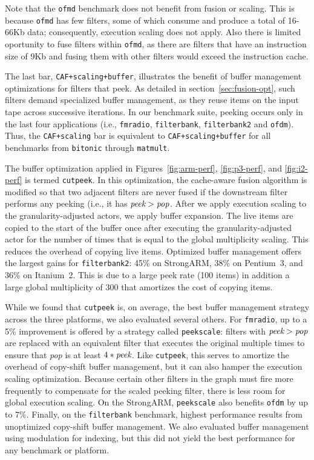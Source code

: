 Note that the \texttt{ofmd} benchmark does not benefit from fusion or
scaling. This is because \texttt{ofmd} has few filters, some of which
consume and produce a total of 16-66Kb data; consequently, execution
scaling does not apply.  Also there is limited oportunity to fuse
filters within \texttt{ofmd}, as there are filters that have an
instruction size of 9Kb and fusing them with other filters would
exceed the instruction cache.

The last bar, {\tt CAF+scaling+buffer}, illustrates the benefit of
buffer management optimizations for filters that peek.  As detailed in
section~\ref{sec:fusion-opt}, such filters demand specialized buffer
management, as they reuse items on the input tape across successive
iterations.  In our benchmark suite, peeking occurs only in the last
four applications (i.e., \texttt{fmradio}, \texttt{filterbank},
\texttt{filterbank2} and \texttt{ofdm}).  Thus, the {\tt CAF+scaling}
bar is equivalent to {\tt CAF+scaling+buffer} for all benchmarks from
{\tt bitonic} through {\tt matmult}.

The buffer optimization applied in Figures~\ref{fig:arm-perf},
\ref{fig:p3-perf}, and \ref{fig:i2-perf} is termed {\tt cutpeek}.  In
this optimization, the cache-aware fusion algorithm is modified so
that two adjacent filters are never fused if the downstream filter
performs any peeking (i.e., it has $\mbox{\it peek} > \mbox{\it pop}$.
After we apply execution scaling to the granularity-adjusted actors,
we apply buffer expansion.  The live items are copied to the start of
the buffer once after executing the granularity-adjusted actor for the
number of times that is equal to the global multiplicity scaling. This
reduces the overhead of copying live items.  Optimized buffer
management offers the largest gains for {\tt filterbank2}: 45\%
on StrongARM, 38\% on Pentium~3, and 36\% on Itanium~2.
This is due to a large peek rate (100 items) in addition a large
global multiplicity of 300 that amortizes the cost of copying
items.

While we found that {\tt cutpeek} is, on average, the best buffer
management strategy across the three platforms, we also evaluated
several others.  For {\tt fmradio}, up to a 5\% improvement is offered
by a strategy called {\tt peekscale}: filters with $\mbox{\it
peek}>\mbox{\it pop}$ are replaced with an equivalent filter that
executes the original multiple times to ensure that {\it pop} is at
least $4*\mbox{\it peek}$.  Like {\tt cutpeek}, this serves to
amortize the overhead of copy-shift buffer management, but it can also
hamper the execution scaling optimization.  Because certain other
filters in the graph must fire more frequently to compensate for the
scaled peeking filter, there is less room for global execution
scaling.  On the StrongARM, {\tt peekscale} also benefits {\tt ofdm}
by up to 7\%.  Finally, on the {\tt filterbank} benchmark, highest
performance results from unoptimized copy-shift buffer management.  We
also evaluated buffer management using modulation for indexing, but
this did not yield the best performance for any benchmark or platform.

